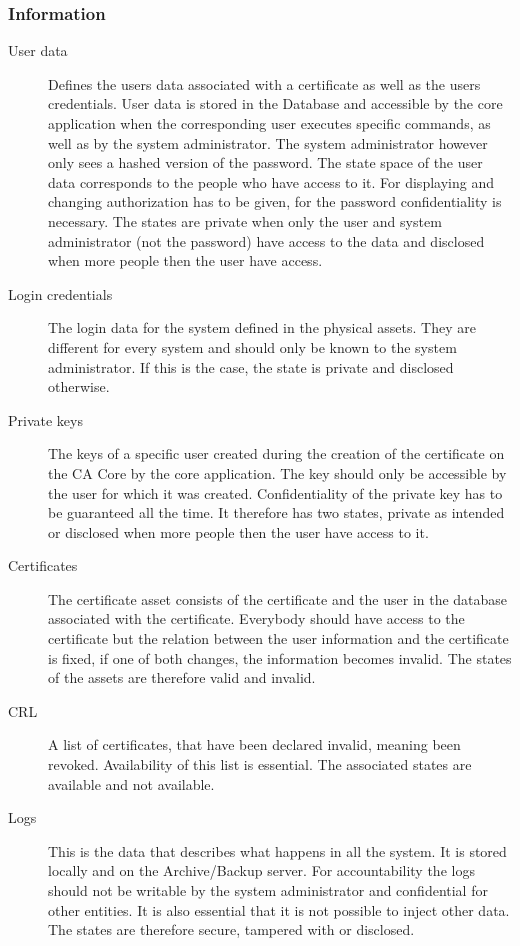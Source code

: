 \documentclass[a4paper, toc=index, 12pt, DIV14, twoside, BCOR2cm, headsepline, numbers=noenddot, bibliography=totoc]{scrbook}
\begin{document}
\subsubsection{Information}
\begin{description}
\item[User data ] Defines the users data associated with a certificate as well as the users credentials. User data is stored in the Database and accessible by the core application when the corresponding user executes specific commands, as well as by the system administrator. The system administrator however only sees a hashed version of the password. The state space of the user data corresponds to the people who have access to it. For displaying and changing authorization has to be given, for the password confidentiality is necessary. The states are private when only the user and system administrator (not the password) have access to the data and disclosed when more people then the user have access.
\item[Login credentials ] The login data for the system defined in the physical assets. They are different for every system and should only be known to the system administrator. If this is the case, the state is private and disclosed otherwise.
\item[Private keys ] The keys of a specific user created during the creation of the certificate on the CA Core by the core application. The key should only be accessible by the user for which it was created. Confidentiality of the private key has to be guaranteed all the time. It therefore has two states, private as intended or disclosed when more people then the user have access to it. 
\item[Certificates ] The certificate asset consists of the certificate and the user in the database associated with the certificate. Everybody should have access to the certificate but the relation between the user information and the certificate is fixed, if one of both changes, the information becomes invalid. The states of the assets are therefore valid and invalid.
\item[CRL ] A list of certificates, that have been declared invalid, meaning been revoked. Availability of this list is essential. The associated states are available and not available.
\item[Logs ] This is the data that describes what happens in all the system. It is stored locally and on the Archive/Backup server. For accountability the logs should not be writable by the system administrator and confidential for other entities. It is also essential that it is not possible to inject other data. The states are therefore secure, tampered with or disclosed.

\end{description}
\end{document}

